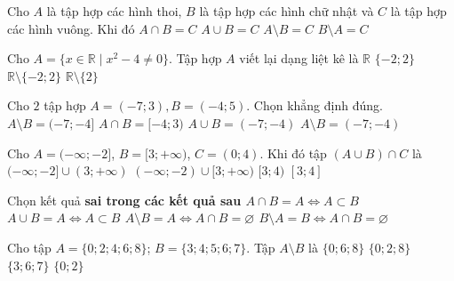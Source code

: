 \begin{ex}%
	Cho $A$ là tập hợp  các hình thoi, $B$ là tập hợp các hình chữ nhật và $C$ là tập hợp các hình vuông. Khi đó
	\choice 
		 {\True $A \cap B=C$}
		{$A  \cup B=C$}
		{$A \setminus B=C$} 
		{$B \setminus A=C$} 
\end{ex}

\begin{ex}%
	Cho  $A=\{x \in \mathbb{R} \mid x^2-4 \ne 0\}$. Tập hợp $A$ viết lại dạng liệt kê là
	 \choice
		 {$\mathbb{R} $}
		 {$\{-2;2\}$}
		{\True  $\mathbb{R} \setminus \{-2;2\}$}
		{$\mathbb{R}  \setminus \{2\}$}
\end{ex}

\begin{ex}%
	Cho  $2$ tập hợp $A=(-7;3),B=(-4;5)$. Chọn khẳng định đúng.
	 \choice
		{\True $A \setminus  B=(-7;-4]$}
		{$A \cap  B=[-4;3)$}
		{$A \cup  B=(-7;-4)$}
		{$A  \setminus B=(-7;-4)$}
	 \loigiai{
	Ta có: $A=(-7;3),B=(-4;5)$  nên $A \setminus B=(-7;-4]$.}
\end{ex}

\begin{ex}%
	Cho $A=(-\infty;-2]$,  $B=[3;+\infty)$, $C=(0;4)$. Khi đó tập $\left(A\cup B\right)\cap C$ là
	\choice 
		 {$(-\infty;-2]\cup (3;+\infty)$}
		{$(-\infty;-2)\cup [3;+\infty)$} 
		 {\True $[3;4)$}
		{$[3;4]$} 
	\loigiai{ 
	Ta có $A\cup B=(-\infty;-2]\cup [3;+\infty)$. Suy  ra $\left(A\cup B\right)\cap C=[3;4)$.}
\end{ex}

\begin{ex}%
	Chọn kết quả  \bf{sai} trong các kết quả sau
	 \choice
		{$A \cap B=A  \Leftrightarrow A \subset B$}
		 {\True $A \cup B=A \Leftrightarrow A \subset B$}
		{$A \setminus B=A \Leftrightarrow A \cap  B=\varnothing$}
		{$B \setminus A=B\Leftrightarrow  A \cap B=\varnothing$}
\end{ex}

\begin{ex}%
	Cho tập $A=\{0;2;4;6;8\}$; $B=\{3;4;5;6;7\}$. Tập $A\setminus  B$ là
	 \choice
		{$\{0;6;8\}$} 
		 {\True $\{0;2;8\}$}
		{$\{3;6;7\}$} 
		 {$\{0;2\}$}
\end{ex}

